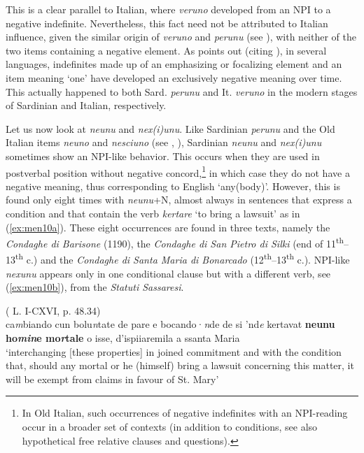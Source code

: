 \documentclass[output=paper,colorlinks,citecolor=brown]{langscibook}
\begin{document}
This is a clear parallel to Italian, where \textit{veruno} developed from an NPI to a negative indefinite. Nevertheless, this fact need not be attributed to Italian influence, given the similar origin of \textit{veruno} and \textit{perunu} (see ), with neither of the two items containing a negative element. As \citet[][4]{Ramat1997} points out (citing \cite[][222]{Haspelmath1997}), in several languages, indefinites made up of an emphasizing or focalizing element and an item meaning ‘one’ have developed an exclusively negative meaning over time. This actually happened to both Sard. \textit{perunu} and It. \textit{veruno} in the modern stages of Sardinian and Italian, respectively.

Let us now look at \textit{neunu} and \textit{nex(i)unu}. Like Sardinian \textit{perunu} and the Old Italian items \textit{neuno} and \textit{nesciuno} (see \citealt{FrancoPoletto2016}, \cite{FrancoKellertMenschingPoletto2016}), Sardinian \textit{neunu} and \textit{nex(i)unu} sometimes show an NPI-like behavior. This occurs when they are used in postverbal position without negative concord,\footnote{In Old Italian, such occurrences of negative indefinites with an NPI-reading occur in a broader set of contexts (in addition to conditions, see also hypothetical free relative clauses and questions).} in which case they do not have a negative meaning, thus corresponding to English ‘any(body)’. However, this is found only eight times with \textit{neunu}+N, almost always in sentences that express a condition and that contain the verb \textit{kertare} ‘to bring a lawsuit’ as in (\ref{ex:men10a}). These eight occurrences are found in three texts, namely the \textit{Condaghe di Barisone} (1190), the \textit{Condaghe di San Pietro di Silki} (end of 11\textsuperscript{th}--13\textsuperscript{th} c.) and the \textit{Condaghe di Santa Maria di Bonarcado} (12\textsuperscript{th}--13\textsuperscript{th} c.). NPI-like \textit{nexunu} appears only in one conditional clause but with a different verb, see (\ref{ex:men10b}), from the \textit{Statuti Sassaresi}.

\ea\label{ex:men10}
    \ea\label{ex:men10a}( L. I-CXVI, p. 48.34)\\
     ca\textit{m}biando cun bolu\textit{n}tate de pare e bocando·\textit{n}de de si 'nd\textit{e} kertavat \textbf{neunu ho\textit{min}e mo\textit{r}tale} o isse, d'ispiiaremila a ssanta Maria\\
    ‘interchanging [these properties] in joined commitment and with the condition that, should any mortal or he (himself) bring a lawsuit concerning this matter, it will be exempt from claims in favour of St. Mary’
\end{document}
